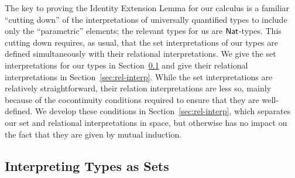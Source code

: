 \documentclass[runningheads]{llncs}
\begin{document}
The key to proving the Identity Extension Lemma
for our calculus is a familiar ``cutting down'' of the interpretations
of universally quantified types to include only the ``parametric''
elements; the relevant types for us are $\mathsf{Nat}$-types.
This cutting down requires, as usual, that the set interpretations of
our types are defined simultaneously with their relational
interpretations. We give the set interpretations for our types in
Section~\ref{sec:set-interp} and give their relational interpretations
in Section~\ref{sec:rel-interp}.  While the set interpretations are
relatively straightforward, their relation interpretations are less
so, mainly because of the cocontinuity conditions required to ensure
that they are well-defined. We develop these conditions in
Section~\ref{sec:rel-interp}, which separates
our set and relational interpretations in space, but otherwise has no
impact on the fact that they are given by mutual induction.

\subsection{Interpreting Types as Sets}\label{sec:set-interp}
\end{document}
